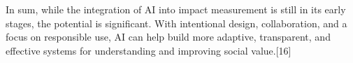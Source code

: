 In sum, while the integration of AI into impact measurement is still in its early stages, the potential is significant. With intentional design, collaboration, and a focus on responsible use, AI can help build more adaptive, transparent, and effective systems for understanding and improving social value.[16]